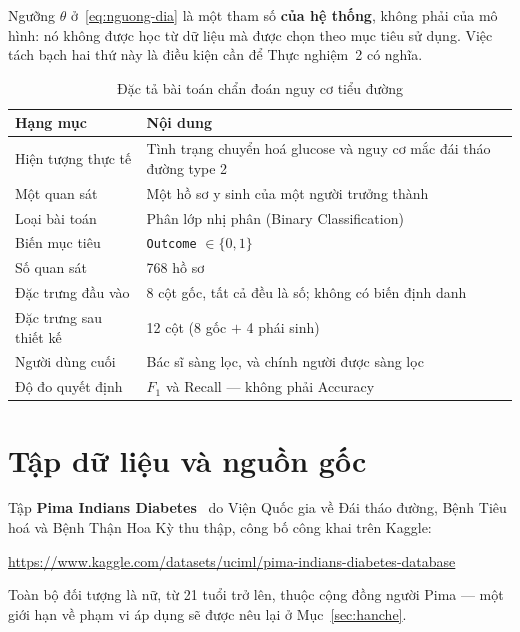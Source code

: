 Ngưỡng $\theta$ ở~\eqref{eq:nguong-dia} là một tham số \textbf{của hệ thống},
không phải của mô hình: nó không được học từ dữ liệu mà được chọn theo mục tiêu
sử dụng. Việc tách bạch hai thứ này là điều kiện cần để Thực nghiệm~2 có nghĩa.

\begin{table}[H]
\centering
\caption{Đặc tả bài toán chẩn đoán nguy cơ tiểu đường}
\label{tab:dacta-dia}
\small
\begin{tabularx}{\textwidth}{@{}L{4.2cm}X@{}}
\toprule
\textbf{Hạng mục} & \textbf{Nội dung} \\
\midrule
Hiện tượng thực tế   & Tình trạng chuyển hoá glucose và nguy cơ mắc đái tháo đường type 2 \\
Một quan sát         & Một hồ sơ y sinh của một người trưởng thành \\
Loại bài toán        & Phân lớp nhị phân (Binary Classification) \\
Biến mục tiêu        & \texttt{Outcome} $\in\{0,1\}$ \\
Số quan sát          & 768 hồ sơ \\
Đặc trưng đầu vào    & 8 cột gốc, tất cả đều là số; không có biến định danh \\
Đặc trưng sau thiết kế & 12 cột (8 gốc $+$ 4 phái sinh) \\
Người dùng cuối      & Bác sĩ sàng lọc, và chính người được sàng lọc \\
Độ đo quyết định     & $F_1$ và Recall --- không phải Accuracy \\
\bottomrule
\end{tabularx}
\end{table}

\section{Tập dữ liệu và nguồn gốc}
\label{sec:dulieu-dia}

Tập \textbf{Pima Indians Diabetes}~\cite{pima} do Viện Quốc gia về Đái tháo đường, Bệnh
Tiêu hoá và Bệnh Thận Hoa Kỳ thu thập, công bố công khai trên Kaggle:

\begin{center}
\small\url{https://www.kaggle.com/datasets/uciml/pima-indians-diabetes-database}
\end{center}

Toàn bộ đối tượng là nữ, từ 21 tuổi trở lên, thuộc cộng đồng người Pima --- một
giới hạn về phạm vi áp dụng sẽ được nêu lại ở Mục~\ref{sec:hanche}.

